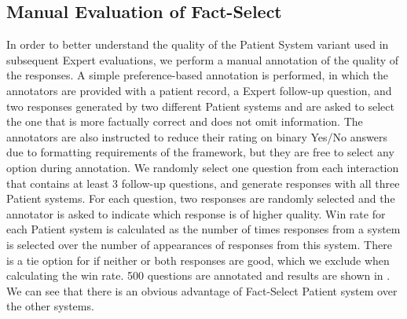 \subsection{Manual Evaluation of Fact-Select}\label{app:patient:human_eval}
In order to better understand the quality of the Patient System variant used in subsequent Expert evaluations, we perform a manual annotation of the quality of the responses. 
A simple preference-based annotation is performed, in which the annotators are provided with a patient record, a Expert follow-up question, and two responses generated by two different Patient systems and are asked to select the one that is more factually correct and does not omit information. The annotators are also instructed to reduce their rating on binary Yes/No answers due to formatting requirements of the framework, but they are free to select any option during annotation. We randomly select one question from each interaction that contains at least 3 follow-up questions, and generate responses with all three Patient systems. For each question, two responses are randomly selected and the annotator is asked to indicate which response is of higher quality. Win rate for each Patient system is calculated as the number of times responses from a system is selected over the number of appearances of responses from this system. There is a tie option for if neither or both responses are good, which we exclude when calculating the win rate. 500 questions are annotated and results are shown in . We can see that there is an obvious advantage of Fact-Select Patient system over the other systems.




\begin{table}[h!]
    \centering
    \vspace{2mm}
    \caption{Win rates from manual evaluation of Patient variants.}\label{tab:patient_annotation}
\end{table}

